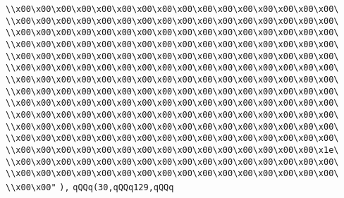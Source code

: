 \verb|\\x00\x00\x00\x00\x00\x00\x00\x00\x00\x00\x00\x00\x00\x00\x00\x00\|\newline
\verb|\\x00\x00\x00\x00\x00\x00\x00\x00\x00\x00\x00\x00\x00\x00\x00\x00\|\newline
\verb|\\x00\x00\x00\x00\x00\x00\x00\x00\x00\x00\x00\x00\x00\x00\x00\x00\|\newline
\verb|\\x00\x00\x00\x00\x00\x00\x00\x00\x00\x00\x00\x00\x00\x00\x00\x00\|\newline
\verb|\\x00\x00\x00\x00\x00\x00\x00\x00\x00\x00\x00\x00\x00\x00\x00\x00\|\newline
\verb|\\x00\x00\x00\x00\x00\x00\x00\x00\x00\x00\x00\x00\x00\x00\x00\x00\|\newline
\verb|\\x00\x00\x00\x00\x00\x00\x00\x00\x00\x00\x00\x00\x00\x00\x00\x00\|\newline
\verb|\\x00\x00\x00\x00\x00\x00\x00\x00\x00\x00\x00\x00\x00\x00\x00\x00\|\newline
\verb|\\x00\x00\x00\x00\x00\x00\x00\x00\x00\x00\x00\x00\x00\x00\x00\x00\|\newline
\verb|\\x00\x00\x00\x00\x00\x00\x00\x00\x00\x00\x00\x00\x00\x00\x00\x00\|\newline
\verb|\\x00\x00\x00\x00\x00\x00\x00\x00\x00\x00\x00\x00\x00\x00\x00\x00\|\newline
\verb|\\x00\x00\x00\x00\x00\x00\x00\x00\x00\x00\x00\x00\x00\x00\x00\x00\|\newline
\verb|\\x00\x00\x00\x00\x00\x00\x00\x00\x00\x00\x00\x00\x00\x00\x00\x1e\|\newline
\verb|\\x00\x00\x00\x00\x00\x00\x00\x00\x00\x00\x00\x00\x00\x00\x00\x00\|\newline
\verb|\\x00\x00\x00\x00\x00\x00\x00\x00\x00\x00\x00\x00\x00\x00\x00\x00\|\newline
\verb|\\x00\x00"|\newline
\verb|),|\newline
\verb|qQQq(30,qQQq129,qQQq|\newline
